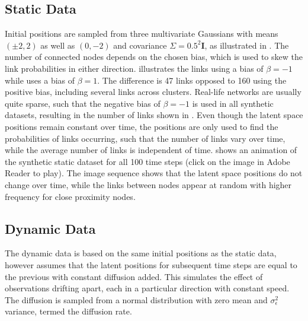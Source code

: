     \subsection{Static Data}
    
        Initial positions are sampled from three multivariate Gaussians with means $(\pm2,2)$ as well as $(0,-2)$ and covariance $\Sigma=0.5^2\bm{I}$, as illustrated in . 
        The number of connected nodes depends on the chosen bias, which is used to skew the link probabilities in either direction.  illustrates the links using a bias of $\beta=-1$ while  uses a bias of $\beta=1$. The difference is 47 links opposed to 160 using the positive bias, including several links across clusters. 
        Real-life networks are usually quite sparse, such that the negative bias of $\beta=-1$ is used in all synthetic datasets, resulting in the number of links shown in . Even though the latent space positions remain constant over time, the positions are only used to find the probabilities of links occurring, such that the number of links vary over time, while the average number of links is independent of time.
         shows an animation of the synthetic static dataset for all 100 time steps (click on the image in Adobe Reader to play). The image sequence shows that the latent space positions do not change over time, while the links between nodes appear at random with higher frequency for close proximity nodes.
    
    \subsection{Dynamic Data}
    
        The dynamic data is based on the same initial positions as the static data, however assumes that the latent positions for subsequent time steps are equal to the previous with constant diffusion added. This simulates the effect of observations drifting apart, each in a particular direction with constant speed. The diffusion is sampled from a normal distribution with zero mean and $\sigma_\epsilon^2$ variance, termed the diffusion rate.
        
